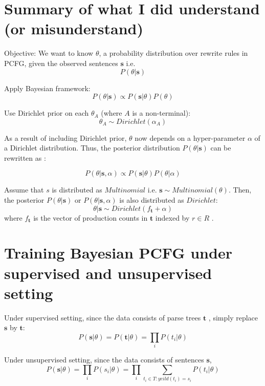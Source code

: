 \documentclass[11pt]{article}
\begin{document}
\section{Summary of what I did understand (or misunderstand)}
Objective: We want to know $\theta$, a probability distribution over rewrite rules in PCFG, given the observed sentences $\boldsymbol{s}$ i.e. 
$$
P(\theta|\boldsymbol{s})
$$


Apply Bayesian framework:
$$
P(\theta|\boldsymbol{s}) \propto P(\boldsymbol{s}|\theta) P(\theta)
$$

Use Dirichlet prior on each $\theta_A$ (where $A$ is a non-terminal):
$$
\theta_A \sim Dirichlet(\alpha_A) 
$$

As a result of including Dirichlet prior, $\theta$ now depends on a hyper-parameter $\alpha$ of a Dirichlet distribution. Thus, the posterior distribution $P(\theta|\boldsymbol{s})$ can be rewritten as \cite{cohen-johnson:2013:ACL2013}:

$$
P(\theta|\boldsymbol{s}, \alpha) \propto P(\boldsymbol{s}|\theta) P(\theta | \alpha)
$$


Assume that $s$ is distributed as $Multinomial$ i.e. $\boldsymbol{s} \sim Multinomial(\theta)$. Then, the posterior $P(\theta|\boldsymbol{s})$ or $P(\theta|\boldsymbol{s}, \alpha)$ is also distributed as $Dirichlet$:
$$
\theta|\boldsymbol{s} \sim Dirichlet(f_{\boldsymbol{t}} + \alpha)
$$
where $f_{\boldsymbol{t}}$ is the vector of production counts in $\boldsymbol{t}$ indexed by $r \in R$ \cite{johnson-griffiths-goldwater:2007:main}.

\section{Training Bayesian PCFG under supervised and unsupervised setting}

Under supervised setting, since the data consists of parse trees $\boldsymbol{t}$ \cite{cohen-johnson:2013:ACL2013}, simply replace $\boldsymbol{s}$ by $\boldsymbol{t}$:
$$
P(\boldsymbol{s}|\theta) =  P(\boldsymbol{t}|\theta) = \prod_i P(t_i | \theta)
$$

Under unsupervised setting, since the data consists of sentences $\boldsymbol{s}$,
$$
P(\boldsymbol{s}|\theta) = \prod_i P(s_i | \theta) = \prod_i \sum_{t_i \in T: yeild(t_i) = s_i} P(t_i | \theta)
$$

\end{document}
